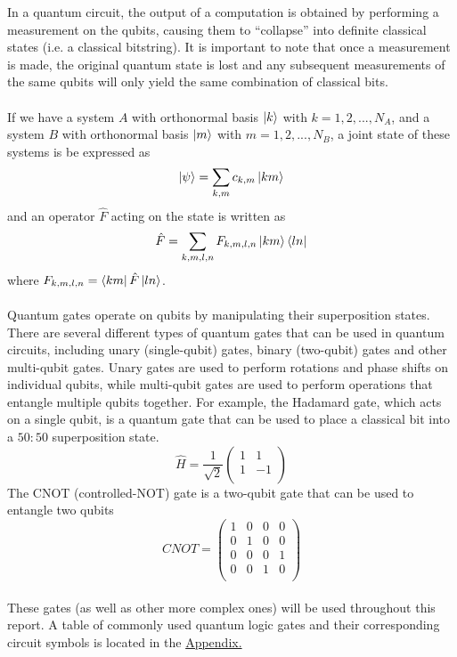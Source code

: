 \documentclass{article}[11pt]
\begin{document}
In a quantum circuit, the output of a computation is obtained by performing a measurement on the qubits, causing them to ``collapse'' into definite classical states (i.e. a classical bitstring). It is important to note that once a measurement is made, the original quantum state is lost and any subsequent measurements of the same qubits will only yield the same combination of classical bits.\\
\\
If we have a system $A$ with orthonormal basis $\ket{k}$ with $k=1,2,...,N_A$, and a system $B$ with orthonormal basis $\ket{m}$ with $m=1,2,...,N_B$, a joint state of these systems is be expressed as\cite{griffiths}
\begin{equation}
\ket{\psi}=\sum_{k,m}c_{k,m}\ket{km}\end{equation}
and an operator $\hat{F}$ acting on the state is written as
\begin{equation}\hat{F} = \sum_{k,m,l,n}F_{k,m,l,n}\ket{km}\bra{ln}\end{equation}
where $F_{k,m,l,n}=\bra{km}\hat F\ket{ln}$.\\
\\
Quantum gates operate on qubits by manipulating their superposition states. There are several different types of quantum gates that can be used in quantum circuits, including unary (single-qubit) gates, binary (two-qubit) gates and other multi-qubit gates. Unary gates are used to perform rotations and phase shifts on individual qubits, while multi-qubit gates are used to perform operations that entangle multiple qubits together. For example, the Hadamard gate, which acts on a single qubit, is a quantum gate that can be used to place a classical bit into a $50:50$ superposition state.\cite{nielsenChuang}
\begin{equation} \hat{H}=\frac{1}{\sqrt2} \begin{pmatrix}
1 & 1 \\
1 & -1\\
\end{pmatrix}\end{equation}
The CNOT (controlled-NOT) gate is a two-qubit gate that can be used to entangle two qubits
\begin{equation} CNOT= \begin{pmatrix}
1 & 0 & 0 & 0 \\
0 & 1 & 0 & 0\\
0 & 0 & 0 & 1\\
0 & 0 & 1 & 0\\
\end{pmatrix}\end{equation}
\\
These gates (as well as other more complex ones) will be used throughout this report. A table of commonly used quantum logic gates and their corresponding circuit symbols is located in the \hyperref[section:appendix]{Appendix.}
\end{document}
